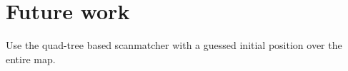 
\chapter{Future work}

Use the quad-tree based scanmatcher with a guessed initial position over the entire map.